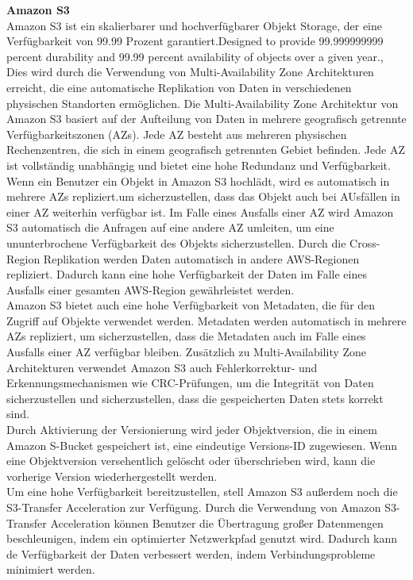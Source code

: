 \textbf{Amazon S3}\\

Amazon S3 ist ein skalierbarer und hochverfügbarer Objekt Storage, der eine Verfügbarkeit von 99.99 Prozent garantiert.\glqq Designed to provide 99.999999999 percent durability and 99.99 percent availability of objects over a given year.\grqq, \cite{aws-availability}\\

Dies wird durch die Verwendung von Multi-Availability Zone Architekturen erreicht, die eine automatische Replikation von Daten in verschiedenen physischen Standorten ermöglichen. Die Multi-Availability Zone Architektur von Amazon S3 basiert auf der Aufteilung von Daten in mehrere geografisch getrennte Verfügbarkeitszonen (AZs). Jede AZ besteht aus mehreren physischen Rechenzentren, die sich in einem geografisch getrennten Gebiet befinden. Jede AZ ist vollständig unabhängig und bietet eine hohe Redundanz und Verfügbarkeit. Wenn ein Benutzer ein Objekt in Amazon S3 hochlädt, wird es automatisch in mehrere AZs repliziert.um sicherzustellen, dass das Objekt auch bei AUsfällen in einer AZ weiterhin verfügbar ist. Im Falle eines Ausfalls einer AZ wird Amazon S3 automatisch die Anfragen auf eine andere AZ umleiten, um eine ununterbrochene Verfügbarkeit des Objekts sicherzustellen. Durch die Cross-Region Replikation werden Daten automatisch in andere AWS-Regionen repliziert. Dadurch kann eine hohe Verfügbarkeit der Daten im Falle eines Ausfalls einer gesamten AWS-Region gewährleistet werden.\\

Amazon S3 bietet auch eine hohe Verfügbarkeit von Metadaten, die für den Zugriff auf Objekte verwendet werden. Metadaten werden automatisch in mehrere AZs repliziert, um sicherzustellen, dass die Metadaten auch im Falle eines Ausfalls einer AZ verfügbar bleiben. Zusätzlich zu Multi-Availability Zone Architekturen verwendet Amazon S3 auch Fehlerkorrektur- und Erkennungsmechanismen wie CRC-Prüfungen, um die Integrität von Daten sicherzustellen und sicherzustellen, dass die gespeicherten Daten stets korrekt sind.\\

Durch Aktivierung der Versionierung wird jeder Objektversion, die in einem Amazon S-Bucket gespeichert ist, eine eindeutige Versions-ID zugewiesen. Wenn eine Objektversion versehentlich gelöscht oder überschrieben wird, kann die vorherige Version wiederhergestellt werden.\\

Um eine hohe Verfügbarkeit bereitzustellen, stell Amazon S3 außerdem noch die S3-Transfer Acceleration zur Verfügung. Durch die Verwendung von Amazon S3-Transfer Acceleration können Benutzer die Übertragung großer Datenmengen beschleunigen, indem ein optimierter Netzwerkpfad genutzt wird. Dadurch kann de Verfügbarkeit der Daten verbessert werden, indem Verbindungsprobleme minimiert werden.\\

